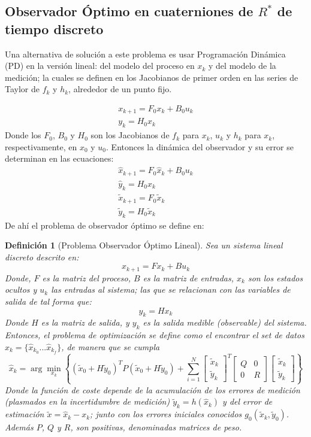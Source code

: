 \documentclass[conference]{IEEEtran}
\newtheorem {defin}{Definición}[section]
\begin{document}
\subsection{Observador Óptimo en cuaterniones de $R^*$ de tiempo discreto}
Una alternativa de solución a este problema es usar Programación Dinámica (PD) \cite{Lewis2012} en la versión lineal: del modelo del proceso en $x_k$ y del modelo de la medición; la cuales se definen en los Jacobianos de primer orden en las series de Taylor de $f_k$ y $h_k$, alrededor de un punto fijo.\par
\begin{gather}
x_{k+1}=F_0x_k+B_0u_k\\
y_{k}=H_0x_k\label{chap2:MedicionLineal}
\end{gather}
Donde los $F_0$, $B_0$ y $H_0$ son los Jacobianos de $f_k$ para $x_k$, $u_k$ y $h_k$ para $x_k$, respectivamente, en $x_0$ y $u_0$. Entonces la dinámica del observador y su error se determinan en las ecuaciones:
\begin{gather}
\hat{x}_{k+1}=F_0\hat{x}_k+B_0u_k\\
\hat{y}_{k}=H_0\hat{x}_k\\
\tilde{x}_{k+1}=F_0\tilde{x}_k\\
\tilde{y}_{k}=H_0\tilde{x}_k
\end{gather}
De ahí el problema de observador óptimo se define en:
\begin{defin}[Problema Observador Óptimo Lineal]\label{problemaobsoptlineal}
Sea un sistema lineal discreto descrito en:
\begin{equation}
\label{filtro_ecc3}
x_{k+1}=Fx_k+Bu_k
\end{equation} 
Donde, $F$ es la matriz del proceso, $B$ es la matriz de entradas, $x_k$ son los estados ocultos y $u_k$ las entradas al sistema; las que se relacionan con las variables de salida de tal forma que:
\begin{equation}
\label{filtro_ecc4}
y_{k}=Hx_k
\end{equation} 
Donde $H$ es la matriz de salida, y $y_k$ es la salida medible (observable) del sistema.
Entonces, el problema de optimización se define como el encontrar el set de datos $\hat{x}_k=\{\hat{x}_{k_0}...\hat{x}_{k_f}\}$, de manera que se cumpla $$\hat{x}_k=\arg\min_{x_k}\left\{(\tilde{x}_0+H\tilde{y}_0)^T
P(\tilde{x}_0+H\tilde{y}_0)+ \sum_{i=1}^{N} \begin{bmatrix}\tilde{x}_k\\\tilde{y}_k\end{bmatrix}^T
\begin{bmatrix}Q&0\\0&R\end{bmatrix} \begin{bmatrix}\tilde{x}_k\\\tilde{y}_k\end{bmatrix} \right\}$$
Donde la función de coste depende de la acumulación de los errores de medición (plasmados en la incertidumbre de medición) $\tilde{y}_k=h(\hat{x}_k)$ y del error de estimación $\tilde{x}=\hat{x}_k-x_k$; junto con los errores iniciales conocidos $g_0(\tilde{x}_k,\tilde{y}_0)$. Además $P$, $Q$ y $R$, son positivas, denominadas matrices de peso.
\end{defin}
\end{document}
